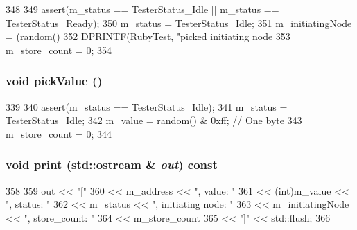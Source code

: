 \begin{DoxyCode}
348 {
349     assert(m_status == TesterStatus_Idle || m_status == TesterStatus_Ready);
350     m_status = TesterStatus_Idle;
351     m_initiatingNode = (random() %
352     DPRINTF(RubyTest, "picked initiating node %
353     m_store_count = 0;
354 }
\end{DoxyCode}
\hypertarget{classCheck_a04d2727906355c9e4bdd78cf34436f41}{
\subsubsection[{pickValue}]{\setlength{\rightskip}{0pt plus 5cm}void pickValue ()}}
\label{classCheck_a04d2727906355c9e4bdd78cf34436f41}



\begin{DoxyCode}
339 {
340     assert(m_status == TesterStatus_Idle);
341     m_status = TesterStatus_Idle;
342     m_value = random() & 0xff; // One byte
343     m_store_count = 0;
344 }
\end{DoxyCode}
\hypertarget{classCheck_ac55fe386a101fbae38c716067c9966a0}{
\subsubsection[{print}]{\setlength{\rightskip}{0pt plus 5cm}void print (std::ostream \& {\em out}) const}}
\label{classCheck_ac55fe386a101fbae38c716067c9966a0}



\begin{DoxyCode}
358 {
359     out << "["
360         << m_address << ", value: "
361         << (int)m_value << ", status: "
362         << m_status << ", initiating node: "
363         << m_initiatingNode << ", store_count: "
364         << m_store_count
365         << "]" << std::flush;
366 }
\end{DoxyCode}


